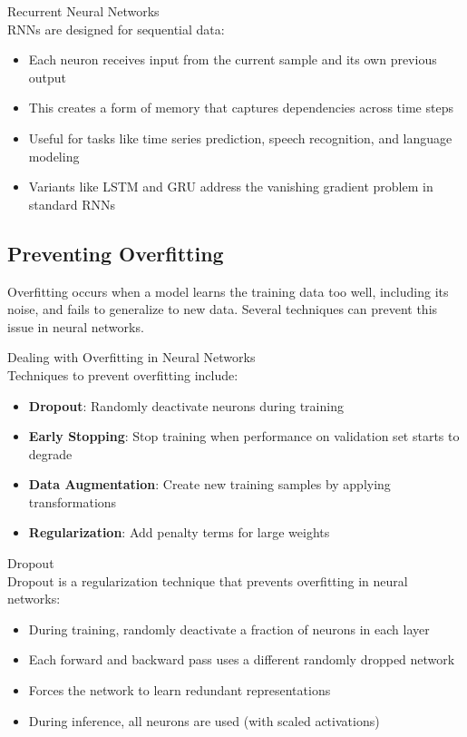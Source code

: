 \begin{concept}{Recurrent Neural Networks}\\
RNNs are designed for sequential data:
\begin{itemize}
    \item Each neuron receives input from the current sample and its own previous output
    \item This creates a form of memory that captures dependencies across time steps
    \item Useful for tasks like time series prediction, speech recognition, and language modeling
    \item Variants like LSTM and GRU address the vanishing gradient problem in standard RNNs
\end{itemize}
\end{concept}

\subsection{Preventing Overfitting}

Overfitting occurs when a model learns the training data too well, including its noise, and fails to generalize to new data. Several techniques can prevent this issue in neural networks.

\begin{concept}{Dealing with Overfitting in Neural Networks}\\
Techniques to prevent overfitting include:
\begin{itemize}
    \item \textbf{Dropout}: Randomly deactivate neurons during training
    \item \textbf{Early Stopping}: Stop training when performance on validation set starts to degrade
    \item \textbf{Data Augmentation}: Create new training samples by applying transformations
    \item \textbf{Regularization}: Add penalty terms for large weights
\end{itemize}
\end{concept}

\begin{definition}{Dropout}\\
Dropout is a regularization technique that prevents overfitting in neural networks:
\begin{itemize}
    \item During training, randomly deactivate a fraction of neurons in each layer
    \item Each forward and backward pass uses a different randomly dropped network
    \item Forces the network to learn redundant representations
    \item During inference, all neurons are used (with scaled activations)
\end{itemize}
\end{definition}

